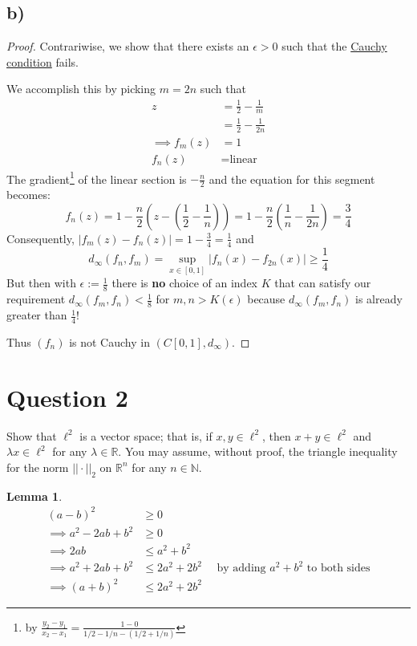 \documentclass[dvipsnames,12pt]{exam}
\newcommand{\N}{{\mathbb{N}}}
\newcommand{\R}{{\mathbb{R}}}
\newtheorem{lemma}[theorem]{Lemma}
\theoremstyle{definition}
\begin{document}
\subsection{b)}
\begin{proof}
    Contrariwise, we show that there exists an $\epsilon > 0$ such that the \hyperref[definition]{Cauchy condition} fails.

    We accomplish this by picking $m = 2n$ such that 
    \begin{align*}
        z &= \frac{1}{2}-\frac{1}{m}\\
        &= \frac{1}{2}-\frac{1}{2n} \\
        \implies f_m(z) &= 1 \\
        f_n(z) &= \text{linear}
    \end{align*}
    The gradient\footnote{by $\frac{y_2-y_1}{x_2-x_1} = \frac{1-0}{1/2 - 1/n - (1/2 + 1/n)}$} of the linear section is $-\frac{n}{2}$ and the equation for this segment becomes:
    \begin{equation*}
        f_n(z) = 1 - \frac{n}{2}\left(z - \left(\frac{1}{2}-\frac{1}{n}\right)\right) = 1- \frac{n}{2}\left(\frac{1}{n} - \frac{1}{2n}\right) = \frac{3}{4}
    \end{equation*}
    Consequently, $|f_m(z) - f_n(z)| = 1- \frac{3}{4} = \frac{1}{4}$ and
    $$d_\infty(f_n, f_m) = \sup_{x\in[0,1]} |f_n(x) -f_{2n}(x)| \geq \frac{1}{4}$$
    But then with $\epsilon := \frac{1}{8}$ there is \textbf{no} choice of an index $K$ that can satisfy our requirement $d_\infty(f_m, f_n) < \frac{1}{8}$ for $m,n > K(\epsilon)$ because $d_\infty(f_m, f_n)$ is already greater than $\frac{1}{4}$!

    Thus $(f_n)$ is not Cauchy in $(C[0,1],d_\infty)$.
\end{proof}

\newpage
\enlargethispage{1cm}
\section{Question 2}
Show that $\ell^2$ is a vector space; that is, if $x, y \in \ell^2$, then $x + y \in \ell^2$ and $\lambda x \in \ell^2$ for any $\lambda \in \mathbb{R}$. You may assume, without proof, the triangle inequality for the norm $||\cdot||_2$ on $\R^n$ for any $n\in \N$.

\begin{lemma}\label{lemm1}
    \begin{align*}
        (a-b)^2 &\geq 0 \\
        \implies a^2 - 2ab + b^2 &\geq 0 \\
        \implies 2ab &\leq a^2 + b^2 \\
        \implies a^2 + 2ab + b^2 &\leq 2a^2 + 2b^2 \quad\text{ by adding }a^2 + b^2 \text{ to both sides} \\
        \implies (a+b)^2 &\leq 2a^2 + 2b^2
    \end{align*}
\end{lemma}
\end{document}
